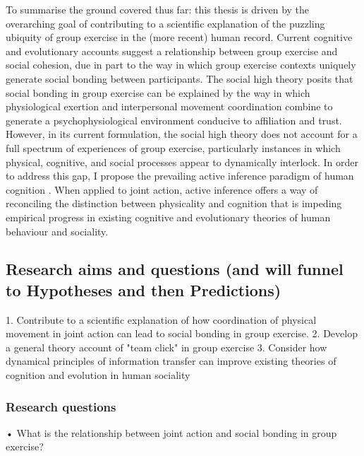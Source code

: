 \begin{CJK}{UTF8}{gbsn}
To summarise the ground covered thus far: this thesis is driven by the overarching goal of contributing to a scientific explanation of the puzzling ubiquity of group exercise in the (more recent) human record. Current cognitive and evolutionary accounts suggest a relationship between group exercise and social cohesion, due in part to the way in which group exercise contexts uniquely generate social bonding between participants.  The social high theory posits that social bonding in group exercise can be explained by the way in which physiological exertion and interpersonal movement coordination combine to generate a psychophysiological environment conducive to affiliation and trust.  However, in its current formulation, the social high theory does not account for a full spectrum of experiences of group exercise, particularly instances in which physical, cognitive, and social processes appear to dynamically interlock. In order to address this gap, I propose the prevailing active inference paradigm of human cognition \citep{Friston2010}. When applied to joint action\citep{Friston2015,Friston2015a}, active inference offers a way of reconciling the distinction between physicality and cognition that is impeding empirical progress in existing cognitive and evolutionary theories of human behaviour and sociality.








\subsection{Research aims and questions (and will funnel to Hypotheses and then Predictions)}



1.	Contribute to a scientific explanation of how coordination of physical movement in joint action can lead to social bonding in group exercise.
2.	Develop a general theory account of "team click" in group exercise
3.	Consider how dynamical principles of information transfer can improve existing theories of cognition and evolution in human sociality



\subsubsection{Research questions}

•	What is the relationship between joint action and social bonding in group exercise?


\end{CJK}
